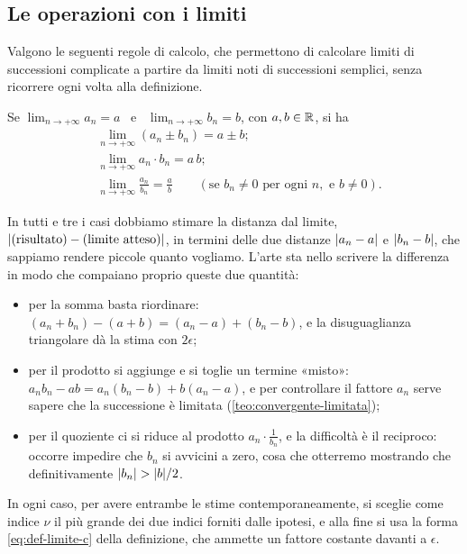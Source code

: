 \subsection{Le operazioni con i limiti}

Valgono le seguenti regole di calcolo, che permettono di calcolare limiti di successioni
complicate a partire da limiti noti di successioni semplici, senza ricorrere ogni volta
alla definizione.

\begin{teorema}\label{teo:operazioni-limiti}
Se $\displaystyle\lim_{n\to+\infty}a_{n}=a$ \ e \ $\displaystyle\lim_{n\to+\infty}b_{n}=b$,
con $a,b\in\mathbb{R}$, si ha
\begin{align}
  &\lim_{n\to+\infty}(a_{n}\pm b_{n})=a\pm b; \label{eq:lim-somma}\\
  &\lim_{n\to+\infty}a_{n}\cdot b_{n}=a\,b; \label{eq:lim-prodotto}\\
  &\lim_{n\to+\infty}\frac{a_{n}}{b_{n}}=\frac ab \qquad(\text{se } b_{n}\neq0 \text{ per ogni } n, \text{ e } b\neq0). \label{eq:lim-quoziente}
\end{align}
\end{teorema}

\begin{schema}
\end{schema}

\begin{strategia}
In tutti e tre i casi dobbiamo stimare la distanza dal limite, $\lvert (\text{risultato})-
(\text{limite atteso})\rvert$, in termini delle due distanze $\lvert a_{n}-a\rvert$ e $\lvert b_{n}-b\rvert$,
che sappiamo rendere piccole quanto vogliamo. L'arte sta nello scrivere la differenza
in modo che compaiano proprio queste due quantità:
\begin{itemize}
  \item per la somma basta riordinare: $(a_{n}+b_{n})-(a+b)=(a_{n}-a)+(b_{n}-b)$, e la
  disuguaglianza triangolare dà la stima con $2\epsilon$;
  \item per il prodotto si aggiunge e si toglie un termine «misto»:
  $a_{n}b_{n}-ab=a_{n}(b_{n}-b)+b(a_{n}-a)$, e per controllare il fattore $a_{n}$ serve
  sapere che la successione è limitata (\cref{teo:convergente-limitata});
  \item per il quoziente ci si riduce al prodotto $a_{n}\cdot\frac1{b_{n}}$, e la
  difficoltà è il reciproco: occorre impedire che $b_{n}$ si avvicini a zero, cosa che
  otterremo mostrando che definitivamente $\lvert b_{n}\rvert>\lvert b\rvert/2$.
\end{itemize}
In ogni caso, per avere entrambe le stime contemporaneamente, si sceglie come indice
$\nu$ il più grande dei due indici forniti dalle ipotesi, e alla fine si usa la forma
\eqref{eq:def-limite-c} della definizione, che ammette un fattore costante davanti a
$\epsilon$.
\end{strategia}

